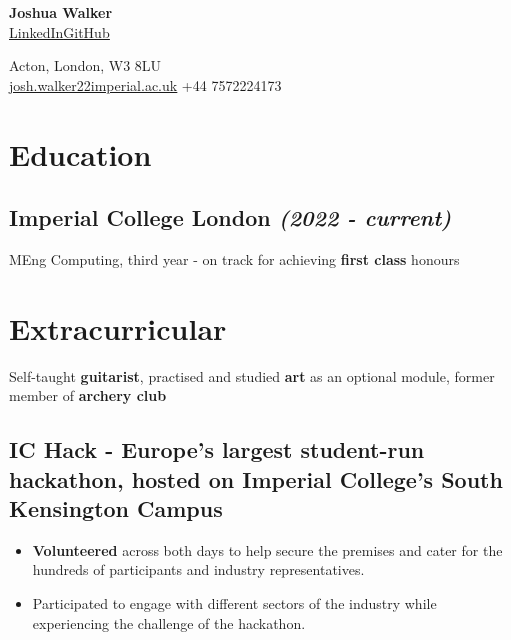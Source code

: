 \documentclass{article}
\makeatletter
\newcommand{\contact}[1]{\normalsize{#1}}
\newcommand{\contactdiv}{\hspace*{0.8em}}
\newcommand{\email}[2]{\href{mailto:#1@#2}{\underline{#1{\small\fontfamily{phv}\selectfont@}#2}}}
\newcommand{\linkedin}{\href{https://www.linkedin.com/in/joshua-walker-080714238/}{\underline{LinkedIn}}}
\newcommand{\github}{\href{https://github.com/josh-ja-walker}{\underline{GitHub}}}
\newcommand{\dates}[1]{\hfill\textit{(#1)}}
\newcommand{\indentsubsection}[2]{
    \subsection*{#1}
    #2
}
\makeatother
\begin{document}
\begin{multicols}{2}

    \begin{flushleft}
        {\LARGE\textbf{Joshua Walker}}\\
        \vspace{0.5em}
        \linkedin\contactdiv\github
    \end{flushleft}
    
    \columnbreak
    
    \begin{flushright}
        \contact{Acton, London, W3 8LU}\\
        \vspace{0.5em}
        \contact{\email{josh.walker22}{imperial.ac.uk}}
        \contactdiv
        \contact{+44 7572224173}
    \end{flushright}
    
\end{multicols}

\vspace{-1em}

\section*{Education}

\indentsubsection{\textbf{Imperial College London} \dates{2022 - current}}{
    MEng Computing, third year - on track for achieving \textbf{first class} honours
}


\section*{Extracurricular}
Self-taught \textbf{guitarist}, 
    practised and studied \textbf{art} as an optional module, 
    former member of \textbf{archery club}

\vspace{-0.65em}

\indentsubsection{\textbf{IC Hack} - Europe's largest student-run hackathon, hosted on Imperial College's South Kensington Campus}{
    \vspace{-0.25em}
    \begin{itemize}[topsep=0em, itemsep=0.05em]
        \item \textbf{Volunteered} across both days to help secure the premises and cater for the hundreds of participants and industry representatives.
        \item Participated to engage with different sectors of the industry while experiencing the challenge of the hackathon.
    \end{itemize}
}
\end{document}

